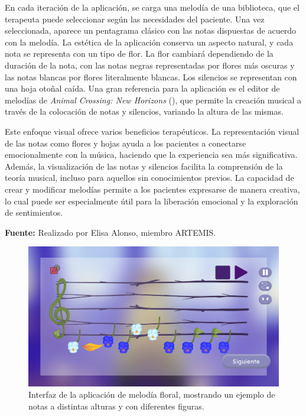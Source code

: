 En cada iteración de la aplicación, se carga una melodía de una biblioteca, que el terapeuta puede seleccionar según las necesidades del paciente. Una vez seleccionada, aparece un pentagrama clásico con las notas dispuestas de acuerdo con la melodía. La estética de la aplicación conserva un aspecto natural, y cada nota se representa con un tipo de flor. La flor cambiará dependiendo de la duración de la nota, con las notas negras representadas por flores más oscuras y las notas blancas por flores literalmente blancas. Los silencios se representan con una hoja otoñal caída. Una gran referencia para la aplicación es el editor de melodías de \textit{Animal Crossing: New Horizons} (\cite{ACNH:2020}), que permite la creación musical a través de la colocación de notas y silencios, variando la altura de las mismas. 

Este enfoque visual ofrece varios beneficios terapéuticos. La representación visual de las notas como flores y hojas ayuda a los pacientes a conectarse emocionalmente con la música, haciendo que la experiencia sea más significativa. Además, la visualización de las notas y silencios facilita la comprensión de la teoría musical, incluso para aquellos sin conocimientos previos. La capacidad de crear y modificar melodías permite a los pacientes expresarse de manera creativa, lo cual puede ser especialmente útil para la liberación emocional y la exploración de sentimientos.

\begin{center}
	\textbf{Fuente:} Realizado por Elisa Alonso, miembro ARTEMIS.
	\vspace{-18pt}
\end{center}

\begin{figure}[h!]
	\centering
	\includegraphics[width=0.8\linewidth]{Figuras/Desarrollo/MelodiaFloralGame.png}
	\caption[Interfaz de la aplicación melodía floral.]{Interfaz de la aplicación de melodía floral, mostrando un ejemplo de notas a distintas alturas y con diferentes figuras.}
	\label{fig:FloralMelodyGame}
\end{figure}

